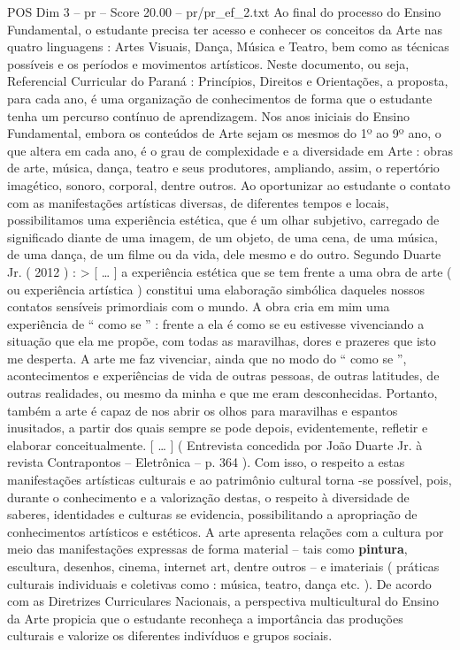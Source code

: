 \begin{textsample}{POS Dim 3 – pr – Score 20.00 – pr/pr\_ef\_2.txt}
Ao final do processo do Ensino Fundamental, o estudante precisa ter acesso e conhecer os conceitos da Arte nas quatro linguagens : Artes Visuais, Dança, Música e Teatro, bem como as técnicas possíveis e os períodos e movimentos artísticos.
Neste documento, ou seja, Referencial Curricular do Paraná : Princípios, Direitos e Orientações, a proposta, para cada ano, é uma organização de conhecimentos de forma que o estudante tenha um percurso contínuo de aprendizagem.
Nos anos iniciais do Ensino Fundamental, embora os conteúdos de Arte sejam os mesmos do 1º ao 9º ano, o que altera em cada ano, é o grau de complexidade e a diversidade em Arte : obras de arte, música, dança, teatro e seus produtores, ampliando, assim, o repertório imagético, sonoro, corporal, dentre outros.
Ao oportunizar ao estudante o contato com as manifestações artísticas diversas, de diferentes tempos e locais, possibilitamos uma experiência estética, que é um olhar subjetivo, carregado de significado diante de uma imagem, de um objeto, de uma cena, de uma música, de uma dança, de um filme ou da vida, dele mesmo e do outro.
Segundo Duarte Jr. ( 2012 ) : > [ … ] a experiência estética que se tem frente a uma obra de arte ( ou experiência artística ) constitui uma elaboração simbólica daqueles nossos contatos sensíveis primordiais com o mundo.
A obra cria em mim uma experiência de “ como se ” : frente a ela é como se eu estivesse vivenciando a situação que ela me propõe, com todas as maravilhas, dores e prazeres que isto me desperta.
A arte me faz vivenciar, ainda que no modo do “ como se ”, acontecimentos e experiências de vida de outras pessoas, de outras latitudes, de outras realidades, ou mesmo da minha e que me eram desconhecidas.
Portanto, também a arte é capaz de nos abrir os olhos para maravilhas e espantos inusitados, a partir dos quais sempre se pode depois, evidentemente, refletir e elaborar conceitualmente. [ … ] ( Entrevista concedida por João Duarte Jr. à revista Contrapontos – Eletrônica – p. 364 ).
Com isso, o respeito a estas manifestações artísticas culturais e ao patrimônio cultural torna -se possível, pois, durante o conhecimento e a valorização destas, o respeito à diversidade de saberes, identidades e culturas se evidencia, possibilitando a apropriação de conhecimentos artísticos e estéticos.
A arte apresenta relações com a cultura por meio das manifestações expressas de forma material – tais como \textbf{pintura}, escultura, desenhos, cinema, internet art, dentre outros – e imateriais ( práticas culturais individuais e coletivas como : música, teatro, dança etc. ).
De acordo com as Diretrizes Curriculares Nacionais, a perspectiva multicultural do Ensino da Arte propicia que o estudante reconheça a importância das produções culturais e valorize os diferentes indivíduos e grupos sociais.

\end{textsample}
